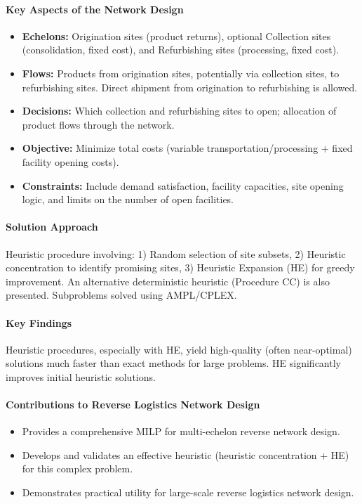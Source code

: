 \paragraph{Key Aspects of the Network Design}
\begin{itemize}
    \item \textbf{Echelons:} Origination sites (product returns), optional Collection sites (consolidation, fixed cost), and Refurbishing sites (processing, fixed cost).
    \item \textbf{Flows:} Products from origination sites, potentially via collection sites, to refurbishing sites. Direct shipment from origination to refurbishing is allowed.
    \item \textbf{Decisions:} Which collection and refurbishing sites to open; allocation of product flows through the network.
    \item \textbf{Objective:} Minimize total costs (variable transportation/processing + fixed facility opening costs).
    \item \textbf{Constraints:} Include demand satisfaction, facility capacities, site opening logic, and limits on the number of open facilities.
\end{itemize}
\paragraph{Solution Approach} Heuristic procedure involving: 1) Random selection of site subsets, 2) Heuristic concentration to identify promising sites, 3) Heuristic Expansion (HE) for greedy improvement. An alternative deterministic heuristic (Procedure CC) is also presented. Subproblems solved using AMPL/CPLEX.
\paragraph{Key Findings} Heuristic procedures, especially with HE, yield high-quality (often near-optimal) solutions much faster than exact methods for large problems. HE significantly improves initial heuristic solutions.
\paragraph{Contributions to Reverse Logistics Network Design}
\begin{itemize}
    \item Provides a comprehensive MILP for multi-echelon reverse network design.
    \item Develops and validates an effective heuristic (heuristic concentration + HE) for this complex problem.
    \item Demonstrates practical utility for large-scale reverse logistics network design.
\end{itemize}
